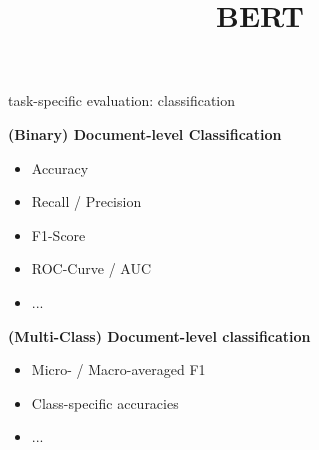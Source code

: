 


\usepackage{animate}

\newcommand{\titlefigure}{figure/metrics.png}
\newcommand{\learninggoals}{
\item Task-specific metrics
\item Metrics for text output
\item How to evaluate retrieval
\item Subtle aspects of evaluation}

\title{BERT}
\date{}




\begin{vbframe}{task-specific evaluation: classification}

\vfill

\textbf{(Binary) Document-level Classification}

\begin{itemize}
	\item Accuracy
	\item Recall / Precision
	\item F1-Score
	\item ROC-Curve / AUC
	\item ...
\end{itemize}

\textbf{(Multi-Class) Document-level classification}

\begin{itemize}
	\item Micro- / Macro-averaged F1
	\item Class-specific accuracies
	\item ...
\end{itemize}
\vfill

\end{vbframe}


